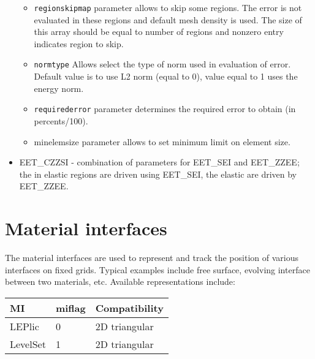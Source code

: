 \documentclass[a4paper]{report}
\newcommand{\param}[1]{\texttt{#1}} %
\begin{document}
\begin{itemize}
\begin{itemize}
\item \param{regionskipmap} parameter allows to skip some regions. The
error is not evaluated in these regions and default mesh density is
used. The size of this array should be equal to number of regions and
nonzero entry indicates region to skip.
\item \param{normtype} Allows select the type of norm used in
evaluation of error. Default value is to use L2 norm (equal to 0),
value equal to 1 uses the energy norm.
\item \param{requirederror} parameter determines the required error to
obtain (in percents/100).
\item{minelemsize} parameter allows to set minimum limit on element size.
\end{itemize}
\item
EET\_CZZSI - combination of parameters for EET\_SEI and EET\_ZZEE; the
in elastic regions are driven using EET\_SEI, the elastic are driven
by EET\_ZZEE.
\end{itemize}


\section{Material interfaces}
\label{materialinterfaces}
The material interfaces are used to represent and track the position of
various interfaces on fixed grids. Typical examples include free surface,
evolving interface between two materials, etc.
Available representations include:

\begin{tabular}{|l|l|l|}
\hline
MI & miflag & Compatibility  \\
\hline
LEPlic & 0 & 2D triangular \\
LevelSet & 1 & 2D triangular \\
\hline
\end{tabular}
\end{document}
